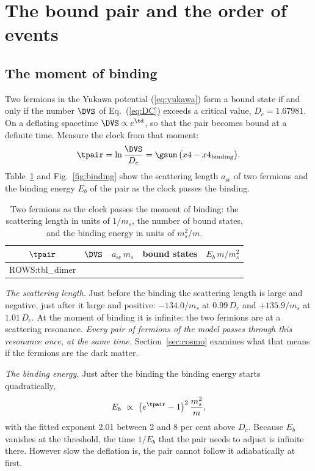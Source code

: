 \section{The bound pair and the order of events}
\label{sec:pair}

\subsection{The moment of binding}

Two fermions in the Yukawa potential (\ref{eq:yukawa}) form a bound state if and only if the number
$\DVS$ of Eq.~(\ref{eq:DC}) exceeds a critical value, $D_c=1.67981$. On a deflating spacetime
$\DVS\propto e^{\td}$, so that the pair becomes bound at a definite time. Measure the clock from that
moment:
\begin{equation}
\tpair=\ln\frac{\DVS}{D_c}=\gsum\,\big(x4-x4_{\mathrm{binding}}\big).
\label{eq:tpair}
\end{equation}
Table~\ref{tab:dimer} and Fig.~\ref{fig:binding} show the scattering length $a_{\mathrm{sc}}$ of two
fermions and the binding energy $E_b$ of the pair as the clock passes the binding.

\begin{table}
\caption{\label{tab:dimer}Two fermions as the clock passes the moment of binding: the scattering
length in units of $1/m_s$, the number of bound states, and the binding energy in units of
$m_s^{2}/m$.}
\begin{ruledtabular}
\begin{tabular}{ccccc}
$\tpair$ & $\DVS$ & $a_{\mathrm{sc}}\,m_s$ & bound states & $E_b\,m/m_s^{2}$ \\
\hline
{{ROWS:tbl_dimer}}
\end{tabular}
\end{ruledtabular}
\end{table}

\emph{The scattering length.} Just before the binding the scattering length is large and negative,
just after it large and positive: $-134.0/m_s$ at $0.99\,D_c$ and $+135.9/m_s$ at $1.01\,D_c$. At the
moment of binding it is infinite: the two fermions are at a scattering resonance. \emph{Every pair
of fermions of the model passes through this resonance once, at the same time.}
Section~\ref{sec:cosmo} examines what that means if the fermions are the dark matter.

\emph{The binding energy.} Just after the binding the binding energy starts quadratically,
\begin{equation}
E_b\ \propto\ \big(e^{\tpair}-1\big)^{2}\,\frac{m_s^{2}}{m},
\label{eq:Eb}
\end{equation}
with the fitted exponent 2.01 between 2 and 8 per cent above $D_c$. Because $E_b$ vanishes at the
threshold, the time $1/E_b$ that the pair needs to adjust is infinite there. However slow the
deflation is, the pair cannot follow it adiabatically at first.

